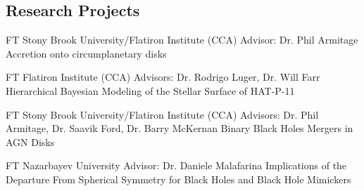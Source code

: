 \documentclass[10pt]{article} %
\begin{document}
\begin{paracol}{1}
\section{Research Projects}




{FT} %
{Stony Brook University/Flatiron Institute (CCA)} %
{Advisor: Dr. Phil Armitage} %
{Accretion onto circumplanetary disks} %

{FT} %
{Flatiron Institute (CCA)} %
{Advisors: Dr. Rodrigo Luger, Dr. Will Farr} %
{Hierarchical Bayesian Modeling of the Stellar Surface of HAT-P-11} %

{FT} %
{Stony Brook University/Flatiron Institute (CCA)} %
{Advisors: Dr. Phil Armitage, Dr. Saavik Ford, Dr. Barry McKernan} %
{Binary Black Holes Mergers in AGN Disks} %



{FT} %
{Nazarbayev University} %
{Advisor: Dr. Daniele Malafarina} %
{Implications of the Departure From Spherical Symmetry for Black Holes and Black Hole Mimickers}  %



\end{paracol}
\end{document}
